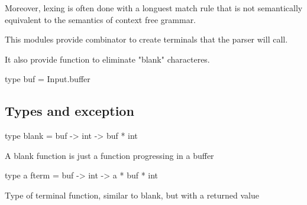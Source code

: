 \documentclass[11pt]{article}
\begin{document}
    Moreover, lexing is often done with a longuest match rule that is not
    semantically equivalent to the semantics of context free grammar.


    This modules provide combinator to create terminals that the parser
    will call.


    It also provide function to eliminate "blank" characteres.



\ocamldocvspace{0.5cm}



\label{type:Lex.buf}\begin{ocamldoccode}
type buf = Input.buffer 
\end{ocamldoccode}
\begin{ocamldocdescription}
\subsection{Types and exception}



\end{ocamldocdescription}




\label{type:Lex.blank}\begin{ocamldoccode}
type blank = buf -> int -> buf * int 
\end{ocamldoccode}
\begin{ocamldocdescription}
A blank function is just a function progressing in a buffer


\end{ocamldocdescription}




\label{type:Lex.fterm}\begin{ocamldoccode}
type {\textquotesingle}a fterm = buf -> int -> {\textquotesingle}a * buf * int 
\end{ocamldoccode}
\begin{ocamldocdescription}
Type of terminal function, similar to blank, but with a returned value


\end{ocamldocdescription}
\end{document}
